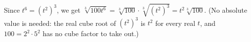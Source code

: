 Since $t^6=\left(t^2\right)^3$, we get $\sqrt[3]{100t^6}=\sqrt[3]{100}\cdot\sqrt[3]{\left(t^2\right)^3}=\boxed{t^2\sqrt[3]{100}}$. (No absolute value is needed: the real cube root of $\left(t^2\right)^3$ is $t^2$ for every real $t$, and $100=2^2\cdot5^2$ has no cube factor to take out.)
